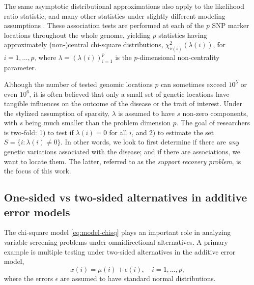 The same asymptotic distributional approximations also apply to the likelihood ratio statistic, and many other statistics under slightly different modeling assumptions \cite{gao2019upass}.
These association tests are performed at each of the $p$ SNP marker locations throughout the whole genome, yielding $p$ statistics having approximately (non-)central chi-square distributions, $\chi_{\nu(i)}^2\left(\lambda(i)\right)$, for $i=1,\ldots,p$,
where $\lambda = (\lambda(i))_{i=1}^p$ is the $p$-dimensional non-centrality parameter.

Although the number of tested genomic locations $p$ can sometimes exceed $10^5$ or even $10^6$, it is often believed that only a small set of genetic locations have tangible influences on the outcome of the disease or the trait of interest.
Under the stylized assumption of sparsity, $\lambda$ is assumed to have $s$ non-zero components, with $s$ being much smaller than the problem dimension $p$. 
The goal of researchers is two-fold: 1) to test if $\lambda(i)=0$ for all $i$, and 2) to estimate the set $S=\{i:\lambda(i)\neq 0\}$.
In other words, we look to first determine if there are \emph{any} genetic variations associated with the disease; and if there are associations, we want to locate them.
The latter, referred to as the \emph{support recovery problem}, is the focus of this work.

\subsection{One-sided vs two-sided alternatives in additive error models}
\label{subsec:motivation-additive}

The chi-square model \eqref{eq:model-chisq} plays an important role in analyzing variable screening problems under omnidirectional alternatives.
A primary example is multiple testing under two-sided alternatives in the additive error model,
\begin{equation} \label{eq:model-additive}
    x(i) = \mu(i) + \epsilon(i), \quad i=1,\ldots,p,
\end{equation}
where the errors $\epsilon$ are assumed to have standard normal distributions.

